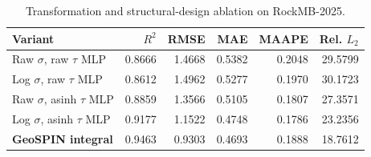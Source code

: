 \begin{table}
\caption{Transformation and structural-design ablation on RockMB-2025.}
\label{tab:transform_ablation}
\begin{tabular}{lrrrrr}
\toprule
Variant & $R^2$ & RMSE & MAE & MAAPE & Rel. $L_2$ \\
\midrule
Raw $\sigma$, raw $\tau$ MLP & 0.8666 & 1.4668 & 0.5382 & 0.2048 & 29.5799 \\
Log $\sigma$, raw $\tau$ MLP & 0.8612 & 1.4962 & 0.5277 & 0.1970 & 30.1723 \\
Raw $\sigma$, asinh $\tau$ MLP & 0.8859 & 1.3566 & 0.5105 & 0.1807 & 27.3571 \\
Log $\sigma$, asinh $\tau$ MLP & 0.9177 & 1.1522 & 0.4748 & 0.1786 & 23.2356 \\
\textbf{GeoSPIN integral} & 0.9463 & 0.9303 & 0.4693 & 0.1888 & 18.7612 \\
\bottomrule
\end{tabular}
\end{table}
